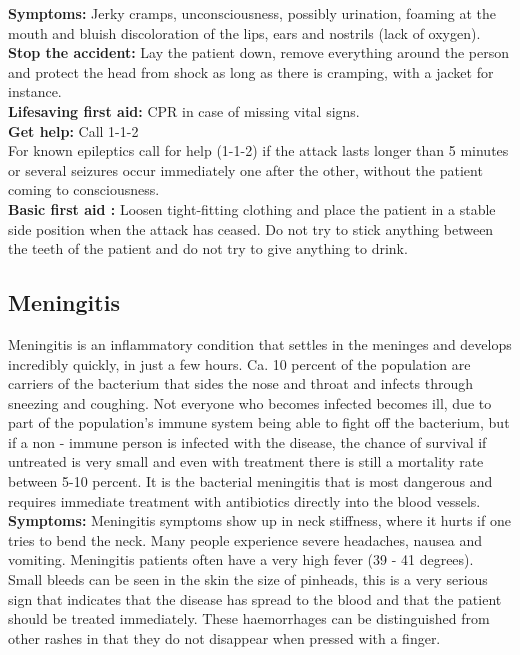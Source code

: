 \documentclass[../../../main.tex]{subfiles}
\begin{document}
\begin{multicols}{2}
\textbf{Symptoms:} Jerky cramps, unconsciousness, possibly urination, foaming at the mouth and bluish discoloration of the lips, ears and nostrils (lack of oxygen).
\\

\textbf{Stop the accident:} Lay the patient down, remove everything around the person and protect the head from shock as long as there is cramping, with a jacket for instance.
\\

\textbf{Lifesaving first aid:} CPR in case of missing vital signs.
\\

\textbf{Get help:} Call 1-1-2
\\

\textbf{}
For known epileptics
call for help (1-1-2) if the attack lasts longer than
5 minutes or several seizures occur immediately
one after the other, without the patient coming to
consciousness.
\\

\textbf{Basic first aid :} Loosen tight-fitting clothing and place the patient in a stable side position when the attack has ceased. Do not try to stick anything between the teeth of the patient and do not try to give anything to drink.
\\
\subsection*{Meningitis}
Meningitis is an inflammatory condition that settles in the meninges and develops incredibly quickly, in just a few hours. Ca. 10 percent of the population are carriers of the bacterium that sides the nose and throat and infects through sneezing and coughing. Not everyone who becomes infected becomes ill, due to part of the population's immune system being able to fight off the bacterium, but if a non - immune person is infected with the disease, the chance of survival if untreated is very small and even with treatment there is still a mortality rate between 5-10 percent. It is the bacterial meningitis that is most dangerous and requires immediate treatment with antibiotics directly into the blood vessels.
\\

\textbf{Symptoms:} Meningitis symptoms show up in neck stiffness, where it hurts if one tries to bend the neck. Many people experience severe headaches, nausea and vomiting. Meningitis patients often have a very high fever (39 - 41 degrees). Small bleeds can be seen in the skin the size of pinheads, this is a very serious sign that indicates that the disease has spread to the blood and that the patient should be treated immediately. These haemorrhages can be distinguished from other rashes in that they do not disappear when pressed with a finger.
\\


\end{multicols}
\end{document}
